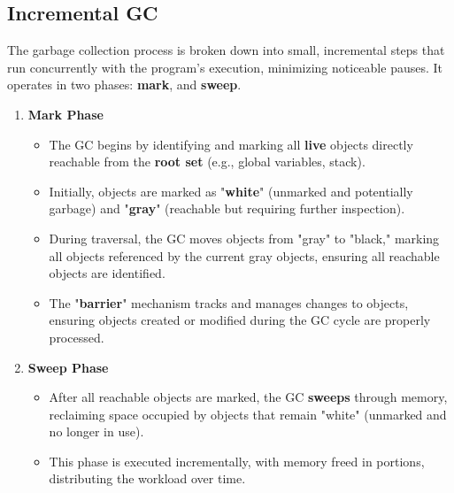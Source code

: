 \documentclass[11pt,paper=a4,answers]{exam}
\begin{document}
\subsection{Incremental GC}
The garbage collection process is broken down into small, incremental steps that run concurrently with the program’s execution, minimizing noticeable pauses. It operates in two phases: \textbf{mark}, and \textbf{sweep}. 

\begin{enumerate}
    \item \textbf{Mark Phase}
    \begin{itemize}
        \item The GC begins by identifying and marking all \textbf{live} objects directly reachable from the \textbf{root set} (e.g., global variables, stack).
        \item Initially, objects are marked as "\textbf{white}" (unmarked and potentially garbage) and "\textbf{gray}" (reachable but requiring further inspection).
        \item During traversal, the GC moves objects from "gray" to "black," marking all objects referenced by the current gray objects, ensuring all reachable objects are identified.
        \item The "\textbf{barrier}" mechanism tracks and manages changes to objects, ensuring objects created or modified during the GC cycle are properly processed.
    \end{itemize}
    \newpage
    \item \textbf{Sweep Phase}
    \begin{itemize}
        \item After all reachable objects are marked, the GC \textbf{sweeps} through memory, reclaiming space occupied by objects that remain "white" (unmarked and no longer in use).
        \item This phase is executed incrementally, with memory freed in portions, distributing the workload over time.
    \end{itemize}
\end{enumerate}
\end{document}
